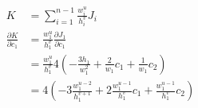 \documentclass{article}
\begin{document}

\begin{align*}
  K &= \sum_{i=1}^{n-1}\frac{w_i^u}{h_i^v}J_i \\
  \frac{\partial K}{\partial c_1}
  &= \frac{w_1^u}{h_1^v}\frac{\partial J_1}{\partial c_1} \\
  &= \frac{w_1^u}{h_1^v}4\left(-\frac{3h_1}{w_1^2}+\frac{2}{w_1}c_1+\frac{1}{w_1}c_2\right) \\
  &= 4\left(-3\frac{w_1^{u-2}}{h_1^{v+1}}+2\frac{w_1^{u-1}}{h_1^v}c_1+\frac{w_1^{u-1}}{h_1^v}c_2\right) \\
\end{align*}
\end{document}
